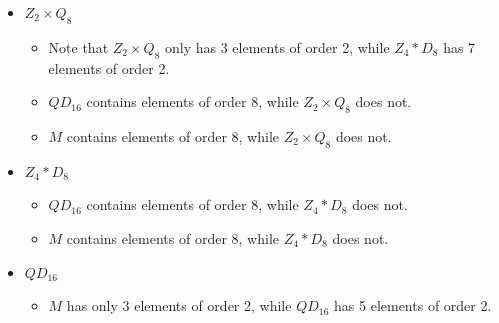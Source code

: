 \begin{sol}
\begin{itemize}
\begin{itemize}
            \item Note that $\bar{(x^k, q)} \in Z_4 \ast Q_8 \cong Z_4 \ast D_8$ has order 2 when $(x^k, q)^2 = (1, 1)$ or $(x^2, -1)$.
	Since we already identify $x^2$ with $-1$ in the quotient, the case of $q^2 = 1$ and $2i \equiv 0 \pmod 4$ gives the same element, hence only 1 element of order 2.
	The other case of $q^2 = -1$ and $2i \equiv 2 \pmod 4$, or $i$ odd and $q = Q_8 - Z(Q_8)$ gives 6 elements of order 2, for a total of 7 elements of order 2 in $Z_4 \ast D_8$, while $Z_2 \times D_8$ has 11 elements of order 2.
            \item $QD_{16}$ contains elements of order 8, while $Z_2 \times D_8$ does not.
            \item $M$ contains elements of order 8, while $Z_2 \times D_8$ does not.
        \end{itemize}
        \item $Z_2 \times Q_8$
        \begin{itemize}
            \item Note that $Z_2 \times Q_8$ only has 3 elements of order 2, while $Z_4 \ast D_8$ has 7 elements of order 2.
            \item $QD_{16}$ contains elements of order 8, while $Z_2 \times Q_8$ does not.
            \item $M$ contains elements of order 8, while $Z_2 \times Q_8$ does not.
        \end{itemize}
        \item $Z_4 \ast D_8$
        \begin{itemize}
            \item $QD_{16}$ contains elements of order 8, while $Z_4 \ast D_8$ does not.
            \item $M$ contains elements of order 8, while $Z_4 \ast D_8$ does not.
        \end{itemize}
        \item $QD_{16}$
        \begin{itemize}
            \item $M$ has only 3 elements of order 2, while $QD_{16}$ has 5 elements of order 2. \qedhere
        \end{itemize}
    \end{itemize}
\end{sol}